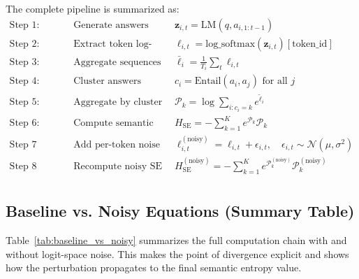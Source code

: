 \documentclass{article}
\begin{document}
The complete pipeline is summarized as:
\begin{equation}
\boxed{
\begin{array}{lll}
\text{Step 1:} & \text{Generate answers} & \boldsymbol{z}_{i,t} = \text{LM}(q, a_{i,1:t-1}) \\
\text{Step 2:} & \text{Extract token log-probs} & \ell_{i,t} = \text{log\_softmax}(\boldsymbol{z}_{i,t})[\text{token\_id}] \\
\text{Step 3:} & \text{Aggregate sequences} & \bar{\ell}_i = \frac{1}{T_i} \sum_{t} \ell_{i,t} \\
\text{Step 4:} & \text{Cluster answers} & c_i = \text{Entail}(a_i, a_j) \text{ for all } j \\
\text{Step 5:} & \text{Aggregate by cluster (LogSumExp)} & \mathcal{P}_k = \log \sum_{i: c_i = k} e^{\tilde{\ell}_i} \\
\text{Step 6:} & \text{Compute semantic entropy} & H_{\text{SE}} = -\sum_{k=1}^{K} e^{\mathcal{P}_k} \mathcal{P}_k \\
\text{Step 7 (optional):} & \text{Add per-token noise} & \ell_{i,t}^{(\text{noisy})} = \ell_{i,t} + \epsilon_{i,t}, \quad \epsilon_{i,t} \sim \mathcal{N}(\mu, \sigma^2) \\
\text{Step 8 (optional):} & \text{Recompute noisy SE} & H_{\text{SE}}^{(\text{noisy})} = -\sum_{k=1}^{K} e^{\mathcal{P}_k^{(\text{noisy})}} \mathcal{P}_k^{(\text{noisy})} \\
\end{array}
}
\label{eq:information_flow}
\end{equation}

\subsection{Baseline vs. Noisy Equations (Summary Table)}

Table~\ref{tab:baseline_vs_noisy} summarizes the full computation chain with and without logit-space noise. This makes the point of divergence explicit and shows how the perturbation propagates to the final semantic entropy value.
\end{document}
